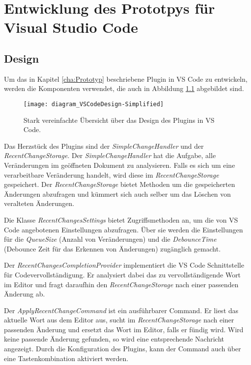 \chapter{Entwicklung des Prototpys für Visual Studio Code}
\label{cha:EntwicklungVsCode}

\section{Design}
\label{sec:EntwicklungVsCode_Design}

Um das in Kapitel \ref{cha:Prototyp} beschriebene Plugin in VS Code
zu entwickeln, werden die Komponenten verwendet, die auch in 
Abbildung \ref{fig:diagram_VSCodeDesign-Simplified} abgebildet sind.
\begin{figure}
    \centering
    \texttt{[image: diagram\_VSCodeDesign-Simplified]}
    \caption{Stark vereinfachte Übersicht über das Design des Plugins in  VS Code.}
    \label{fig:diagram_VSCodeDesign-Simplified}
\end{figure}  

Das Herzstück des Plugins sind der \emph{SimpleChangeHandler} und
der \emph{RecentChangeStorage}. Der \emph{SimpleChangeHandler} hat die Aufgabe,
alle Veränderungen im geöffneten Dokument zu analysieren. Falls es sich um
eine verarbeitbare Veränderung handelt, wird diese im \emph{RecentChangeStorage}
gespeichert. Der \emph{RecentChangeStorage} bietet Methoden um die
gespeicherten Änderungen abzufragen und kümmert sich auch selber um das
Löschen von veralteten Änderungen.

Die Klasse \emph{RecentChangesSettings} bietet Zugriffsmethoden an,
um die von VS Code angebotenen Einstellungen abzufragen. Über sie
werden die Einstellungen für die \emph{QueueSize} (Anzahl von Veränderungen)
und die \emph{DebounceTime} (Debounce Zeit für das Erkennen von Änderungen)
zugänglich gemacht.

Der \emph{RecentChangesCompletionProvider} implementiert die VS Code Schnittstelle
für Codevervollständigung. Er analysiert dabei das zu vervollständigende Wort
im Editor und fragt daraufhin den \emph{RecentChangeStorage} nach einer passenden
Änderung ab.

Der \emph{ApplyRecentChangeCommand} ist ein ausführbarer Command. Er liest
das aktuelle Wort aus dem Editor aus, sucht im \emph{RecentChangeStorage}
nach einer passenden Änderung und ersetzt das Wort im Editor, falls
er fündig wird. Wird keine passende Änderung gefunden, so wird eine entsprechende
Nachricht angezeigt. Durch die Konfiguration des Plugins, kann der
Command auch über eine Tastenkombination aktiviert werden.

